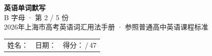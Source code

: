 \documentclass[10pt,a4paper]{article}
\begin{document}
\pagestyle{plain}

\begin{center}
{\LARGE\bfseries 英语单词默写}\\[0.22em]
{\large B 字母 · 第 2 / 5 份}\\[0.18em]
{\small 2026年上海市高考英语词汇用法手册 · 参照普通高中英语课程标准}
\end{center}

\vspace{0.25em}
\noindent\begin{tabular}{@{}p{}@{}p{}@{}p{}@{}}
姓名：\underline{\hspace{2.0cm}} & 日期：\underline{\hspace{2.0cm}} & 得分：\underline{\hspace{1.3cm}}\,/\,47 \\
\end{tabular}

\vspace{0.3em}

\vspace{0.08em}
\end{document}
